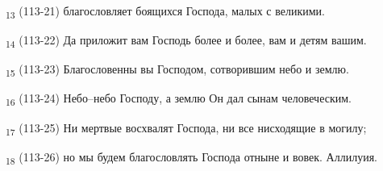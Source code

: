 \begin{tcolorbox}
\textsubscript{13} (113-21) благословляет боящихся Господа, малых с великими.
\end{tcolorbox}
\begin{tcolorbox}
\textsubscript{14} (113-22) Да приложит вам Господь более и более, вам и детям вашим.
\end{tcolorbox}
\begin{tcolorbox}
\textsubscript{15} (113-23) Благословенны вы Господом, сотворившим небо и землю.
\end{tcolorbox}
\begin{tcolorbox}
\textsubscript{16} (113-24) Небо--небо Господу, а землю Он дал сынам человеческим.
\end{tcolorbox}
\begin{tcolorbox}
\textsubscript{17} (113-25) Ни мертвые восхвалят Господа, ни все нисходящие в могилу;
\end{tcolorbox}
\begin{tcolorbox}
\textsubscript{18} (113-26) но мы будем благословлять Господа отныне и вовек. Аллилуия.
\end{tcolorbox}
